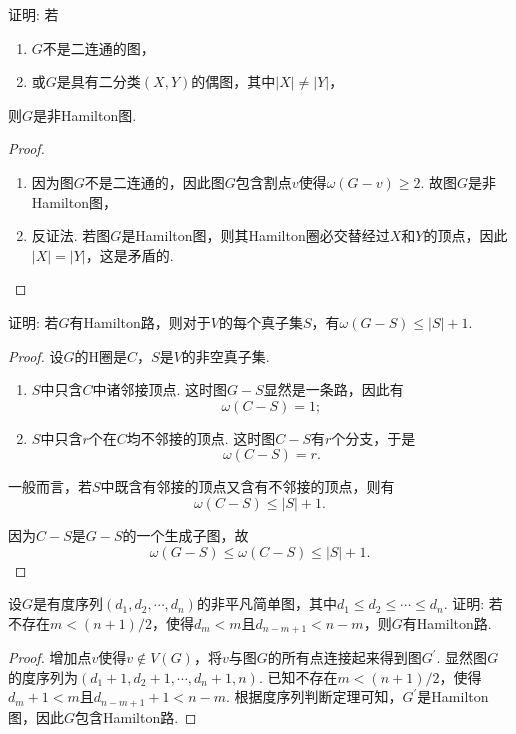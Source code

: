 \documentclass[cn,blue,normal,founder,11pt]{elegantnote}
\begin{document}
\begin{example}
证明: 若
\begin{enumerate}[(1)]
\item \(G\)不是二连通的图，
\item 或\(G\)是具有二分类\((X,Y)\)的偶图，其中\(|X|\ne|Y|\)，
\end{enumerate}
则\(G\)是非Hamilton图.
\end{example}

\begin{proof}
\begin{enumerate}[(1)]
\item 因为图\(G\)不是二连通的，因此图\(G\)包含割点\(v\)使得\(\omega(G-v)\geqslant 2\). 故图\(G\)是非Hamilton图，
\item 反证法. 若图\(G\)是Hamilton图，则其Hamilton圈必交替经过\(X\)和\(Y\)的顶点，因此\(|X|=|Y|\)，这是矛盾的.
\end{enumerate}
\end{proof}

\begin{example}
证明: 若\(G\)有Hamilton路，则对于\(V\)的每个真子集\(S\)，有\(\omega(G-S)\leqslant|S|+1\).
\end{example}

\begin{proof}
设\(G\)的H圈是\(C\)，\(S\)是\(V\)的非空真子集.
\begin{enumerate}[(1)]
\item \(S\)中只含\(C\)中诸邻接顶点. 这时图\(G-S\)显然是一条路，因此有
\[\omega(C-S)=1;\] 
\item \(S\)中只含\(r\)个在\(C\)均不邻接的顶点. 这时图\(C-S\)有\(r\)个分支，于是
\[\omega(C-S)=r.\]
\end{enumerate}
一般而言，若\(S\)中既含有邻接的顶点又含有不邻接的顶点，则有
\[\omega(C-S)\leqslant|S|+1.\]

因为\(C-S\)是\(G-S\)的一个生成子图，故
\[\omega(G-S)\leqslant\omega(C-S)\leqslant|S|+1.\]
\end{proof}

\begin{example}
设\(G\)是有度序列\((d_1,d_2,\cdots,d_n)\)的非平凡简单图，其中\(d_1\leqslant d_2\leqslant\cdots\leqslant d_n\). 证明: 若不存在\(m<(n+1)/2\)，使得\(d_m<m\)且\(d_{n-m+1}<n-m\)，则\(G\)有Hamilton路.
\end{example}

\begin{proof}
增加点\(v\)使得\(v\notin V(G)\)，将\(v\)与图\(G\)的所有点连接起来得到图\(G^{\prime}\). 显然图\(G\)的度序列为\((d_1+1,d_2+1,\cdots,d_n+1,n)\). 已知不存在\(m<(n+1)/2\)，使得\(d_m+1<m\)且\(d_{n-m+1}+1<n-m\). 根据度序列判断定理可知，\(G^{\prime}\)是Hamilton图，因此\(G\)包含Hamilton路.
\end{proof}
\end{document}
